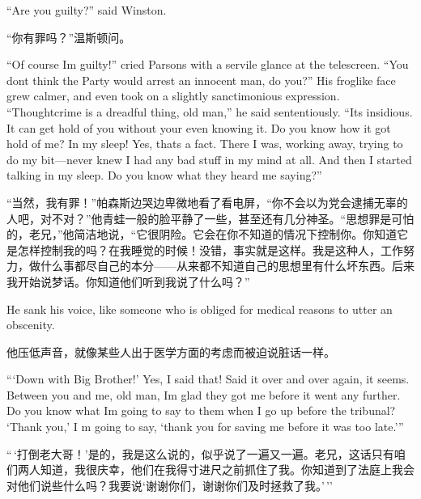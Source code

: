 \begin{paracol}{2}
\switchcolumn*

``Are you guilty?'' said Winston.

\switchcolumn

``你有罪吗？''温斯顿问。

\switchcolumn*

``Of course I\textquotesingle m guilty!'' cried Parsons with a servile
glance at the telescreen. ``You don\textquotesingle t think the Party
would arrest an innocent man, do you?'' His froglike face grew calmer,
and even took on a slightly sanctimonious expression. ``Thoughtcrime is a
dreadful thing, old man,'' he said sententiously. ``It\textquotesingle s
insidious. It can get hold of you without your even knowing it. Do you
know how it got hold of me? In my sleep! Yes, that\textquotesingle s a
fact. There I was, working away, trying to do my bit---never knew I had
any bad stuff in my mind at all. And then I started talking in my sleep.
Do you know what they heard me saying?''

\switchcolumn

``当然，我有罪！''帕森斯边哭边卑微地看了看电屏，``你不会以为党会逮捕无辜的人吧，对不对？''他青蛙一般的脸平静了一些，甚至还有几分神圣。``思想罪是可怕的，老兄，''他简洁地说，``它很阴险。它会在你不知道的情况下控制你。你知道它是怎样控制我的吗？在我睡觉的时候！没错，事实就是这样。我是这种人，工作努力，做什么事都尽自己的本分——从来都不知道自己的思想里有什么坏东西。后来我开始说梦话。你知道他们听到我说了什么吗？''

\switchcolumn*

He sank his voice, like someone who is obliged for medical reasons to
utter an obscenity.

\switchcolumn

他压低声音，就像某些人出于医学方面的考虑而被迫说脏话一样。

\switchcolumn*

```Down with Big Brother!' Yes, I said that! Said it over and over again, it
seems. Between you and me, old man, I\textquotesingle m glad they got me
before it went any further. Do you know what I\textquotesingle m going to
say to them when I go up before the tribunal? `Thank you,' I\textquotesingle
m going to say, `thank you for saving me before it was too
late.'{}''

\switchcolumn

``\,`打倒老大哥！'是的，我是这么说的，似乎说了一遍又一遍。老兄，这话只有咱们两人知道，我很庆幸，他们在我得寸进尺之前抓住了我。你知道到了法庭上我会对他们说些什么吗？我要说`谢谢你们，谢谢你们及时拯救了我。'\,''


\end{paracol}
